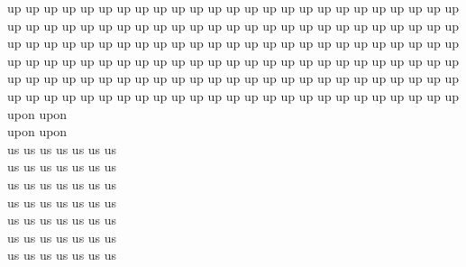 up up up up up up up up up up up up up up up up up up up up up up up up up\\
up up up up up up up up up up up up up up up up up up up up up up up up up\\
up up up up up up up up up up up up up up up up up up up up up up up up up\\
up up up up up up up up up up up up up up up up up up up up up up up up up\\
up up up up up up up up up up up up up up up up up up up up up up up up up\\
up up up up up up up up up up up up up up up up up up up up up up up up up\\
upon upon\\
upon upon\\
us us us us us us us\\
us us us us us us us\\
us us us us us us us\\
us us us us us us us\\
us us us us us us us\\
us us us us us us us\\
us us us us us us us\\


